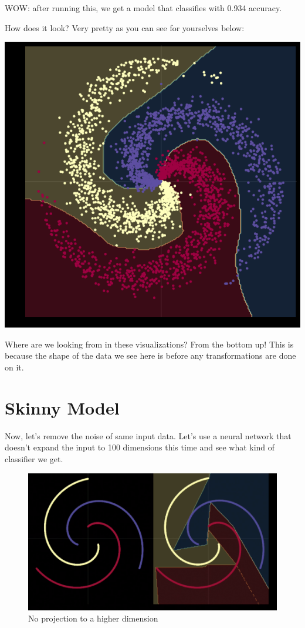 WOW: after running this, we get a model that classifies with 0.934 accuracy. 

How does it look? 
Very pretty as you can see for yourselves below: 

\begin{center}
	\includegraphics[width=0.5\linewidth]{lectures/03-a/images/relu.png}
\end{center}

Where are we looking from in these visualizations? 
From the bottom up! 
This is because the shape of the data we see here is before any transformations are done on it. 

\section{Skinny Model}

Now, let's remove the noise of same input data. 
Let's use a neural network that doesn't expand the input to 100 dimensions this time and see what kind of classifier we get. 

\begin{figure}
	\includegraphics[width=0.85\linewidth]{lectures/03-a/images/not_wide.png}
	\caption{No projection to a higher dimension}
	\label{fig:ugly_low_dim}
\end{figure}


